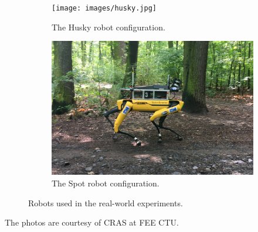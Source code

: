         \begin{figure}[H]
            \centering
            \begin{subfigure}[b]{0.495\textwidth}
                \centering
                \texttt{[image: images/husky.jpg]}
                \caption{The Husky robot configuration.}
                \label{fig:husky}
            \end{subfigure}
            \begin{subfigure}[b]{0.495\textwidth}
                \centering
                \includegraphics[width=\textwidth]{images/spot3.jpg}
                \caption{The Spot robot configuration.}
                \label{fig:spot}
            \end{subfigure}
            \caption{Robots used in the real-world experiments.}
        \end{figure}
        \noindent The photos are courtesy of CRAS at FEE CTU.

